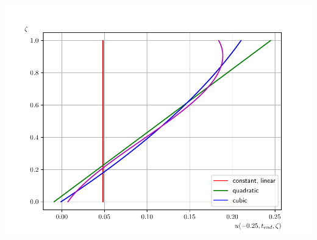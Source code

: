 \documentclass[10pt]{beamer}
\begin{document}
\begin{frame}
        \includegraphics[scale=0.29]{Figures/velocity_profile_-025_torrilhon.pdf}
    \end{frame}
\end{document}
